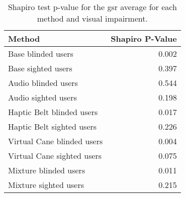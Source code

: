 
\begin{table}[!htb]
\centering
\caption{Shapiro test p-value for the gsr average for each method and visual impairment.}
\label{tab:shapiro_gsr}
\begin{tabular}{lr}
\toprule
                    Method &  Shapiro P-Value \\
\midrule
        Base blinded users &            0.002 \\
        Base sighted users &            0.397 \\
       Audio blinded users &            0.544 \\
       Audio sighted users &            0.198 \\
 Haptic Belt blinded users &            0.017 \\
 Haptic Belt sighted users &            0.226 \\
Virtual Cane blinded users &            0.004 \\
Virtual Cane sighted users &            0.075 \\
     Mixture blinded users &            0.011 \\
     Mixture sighted users &            0.215 \\
\bottomrule
\end{tabular}
\end{table}

